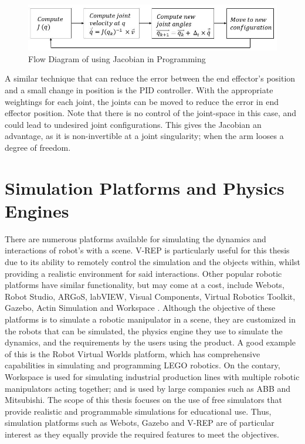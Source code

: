 \documentclass[12pt,openany,a4paper]{book}
\begin{document}
\begin{center}
\begin{figure}[htb]
  \includegraphics[width=\linewidth]{jacobian_programming.jpg}
\caption{Flow Diagram of using Jacobian in Programming}
\end{figure}
\end{center}

A similar technique that can reduce the error between the end effector's position and a small change in position is the PID controller. With the appropriate weightings for each joint, the joints can be moved to reduce the error in end effector position. Note that there is no control of the joint-space in this case, and could lead to undesired joint configurations. This gives the Jacobian an advantage, as it is non-invertible at a joint singularity; when the arm looses a degree of freedom.


\section{Simulation Platforms and Physics Engines}
There are numerous platforms available for simulating the dynamics and interactions of robot's with a scene. V-REP is particularly useful for this thesis due to its ability to remotely control the simulation and the objects within, whilst providing a realistic environment for said interactions. Other popular robotic platforms have similar functionality, but may come at a cost, include Webots, Robot Studio, ARGoS, labVIEW, Visual Components, Virtual Robotics Toolkit, Gazebo, Actin Simulation and Workspace \cite{smashingRobotics}. Although the objective of these platforms is to simulate a robotic manipulator in a scene, they are customized in the robots that can be simulated, the physics engine they use to simulate the dynamics, and the requirements by the users using the product. A good example of this is the Robot Virtual Worlds platform, which has comprehensive capabilities in simulating and programming LEGO robotics. On the contary, Workspace is used for simulating industrial production lines with multiple robotic manipulators acting together; and is used by large companies such as ABB and Mitsubishi. The scope of this thesis focuses on the use of free simulators that provide realistic and programmable simulations for educational use. Thus, simulation platforms such as Webots, Gazebo and V-REP are of particular interest as they equally provide the required features to meet the objectives. 
\end{document}
